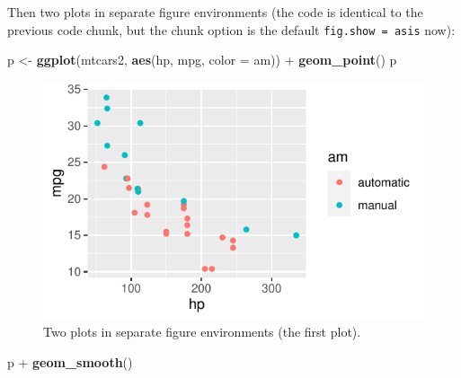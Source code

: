 \documentclass[]{tufte-book}
\newenvironment{Shaded}{}{}
\newcommand{\DataTypeTok}[1]{\textcolor[rgb]{0.56,0.13,0.00}{#1}}
\newcommand{\KeywordTok}[1]{\textcolor[rgb]{0.00,0.44,0.13}{\textbf{#1}}}
\newcommand{\NormalTok}[1]{#1}
\newcommand{\OperatorTok}[1]{\textcolor[rgb]{0.40,0.40,0.40}{#1}}
\newcommand{\StringTok}[1]{\textcolor[rgb]{0.25,0.44,0.63}{#1}}
\begin{document}
Then two plots in separate figure environments (the code is identical to
the previous code chunk, but the chunk option is the default
\texttt{fig.show\ =\ \textquotesingle{}asis\textquotesingle{}} now):

\begin{Shaded}
\begin{Highlighting}[]
\NormalTok{p <-}\StringTok{ }\KeywordTok{ggplot}\NormalTok{(mtcars2, }\KeywordTok{aes}\NormalTok{(hp, mpg, }\DataTypeTok{color =}\NormalTok{ am)) }\OperatorTok{+}
\StringTok{  }\KeywordTok{geom_point}\NormalTok{()}
\NormalTok{p}
\end{Highlighting}
\end{Shaded}

\begin{figure}
\includegraphics{deleteme_files/figure-latex/fig-two-separate-1} \caption[Two plots in separate figure environments (the first plot)]{Two plots in separate figure environments (the first plot).}\label{fig:fig-two-separate-1}
\end{figure}

\begin{Shaded}
\begin{Highlighting}[]
\NormalTok{p }\OperatorTok{+}\StringTok{ }\KeywordTok{geom_smooth}\NormalTok{()}
\end{Highlighting}
\end{Shaded}
\end{document}
